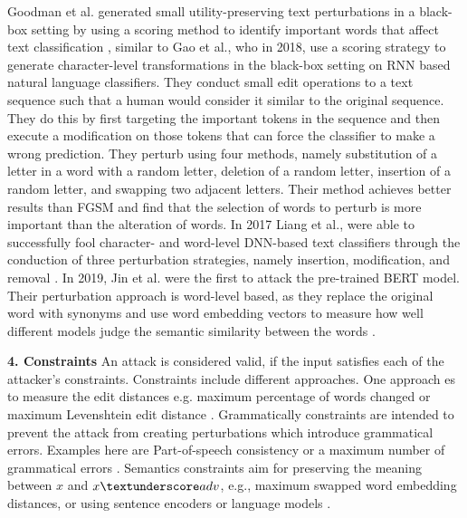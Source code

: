         Goodman et al. generated small utility-preserving text perturbations in a black-box setting by using a scoring method to identify important words that affect text classification \cite{goodman2020fastwordbug}, similar to Gao et al., who in 2018, use a scoring strategy to generate character-level transformations in the black-box setting on RNN based natural language classifiers. They conduct small edit operations to a text sequence such that a human would consider it similar to the original sequence. They do this by first targeting the important tokens in the sequence and then execute a modification on those tokens that can force the classifier to make a wrong prediction. They perturb using four methods, namely substitution of a letter in a word with a random letter, deletion of a random letter, insertion of a random letter, and swapping two adjacent letters. Their method achieves better results than FGSM  and find that the selection of words to perturb is more important than the alteration of words\cite{gao2018black}.  In 2017 Liang et al., were able to successfully fool character- and word-level DNN-based text classifiers through the conduction of three perturbation strategies, namely insertion, modification, and removal \cite{liang2017deep}. In 2019, Jin et al. were the first to attack the pre-trained BERT model. Their perturbation approach is word-level based, as they replace the original word with synonyms and use word embedding vectors to measure how well different models judge the semantic similarity between the words \cite{jin2019bert}.


    \textbf{4. Constraints}
        An attack is considered valid, if the input satisfies each of the attacker's constraints. Constraints include different approaches. One approach es to measure the edit distances e.g. maximum percentage of words changed \cite{ebrahimi2017hotflip} or maximum Levenshtein edit distance \cite{gao2018black}. Grammatically constraints are intended to prevent the attack from creating perturbations which introduce grammatical errors. Examples here are Part-of-speech consistency or a maximum number of grammatical errors \cite{ebrahimi2017hotflip, jin2019bert}. Semantics constraints aim for preserving the meaning between $x$ and $x\textunderscore adv$, e.g., maximum swapped word embedding distances, or using sentence encoders or language models \cite{cer2018universal, garg2020bae, jin2019bert, li2018textbugger, alzantot2018generating, ebrahimi2017hotflip}.






